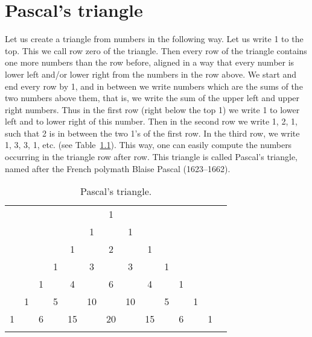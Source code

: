 

\chapter{Pascal's triangle}\label{cha:Pascal}


Let us create a triangle from numbers in the following way. 
Let us write 1 to the top. 
This we call row zero of the triangle. 
Then every row of the triangle contains one more numbers than the row before, 
aligned in a way that every number is lower left and/or lower right from the numbers in the row above. 
We start and end every row by 1, 
and in between we write numbers which are the sums of the two numbers above them, 
that is, we write the sum of the upper left and upper right numbers. 
Thus in the first row (right below the top 1) 
we write 1 to lower left and to lower right of this number. 
Then in the second row we write 1, 2, 1, 
such that 2 is in between the two 1's of the first row. 
In the third row, we write 1, 3, 3, 1, etc. (see Table~\ref{tab:PascalTriangle}). 
This way, one can easily compute the numbers occurring in the triangle row after row. 
This triangle is called Pascal's triangle, 
named after the French polymath Blaise Pascal (1623--1662).%

\begin{table}[!htb]
\caption{Pascal's triangle.}\label{tab:PascalTriangle}
\begin{center}
\begin{tabular}{cccccccccccccc} 
& & & & & & 1\\
\noalign{\smallskip\smallskip} 
& & & & & 1 & & 1\\
\noalign{\smallskip\smallskip} 
& & & & 1 & & 2 & & 1\\
\noalign{\smallskip\smallskip} 
& & & 1 & & 3 & & 3 & & 1\\
\noalign{\smallskip\smallskip} 
& & 1 & & 4 & & 6 & & 4 & & 1\\
\noalign{\smallskip\smallskip} 
& 1 & & 5 & & 10 & & 10 & & 5 & & 1 \\
\noalign{\smallskip\smallskip} 
1 & & 6 & & 15 & & 20 & & 15 & & 6 & & 1 \\
\noalign{\smallskip\smallskip} 
\end{tabular}
\end{center}
\end{table}


